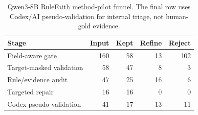 \begin{table}[t]
\centering
\small
\begin{tabular}{lrrrr}
\toprule
Stage & Input & Kept & Refine & Reject \\
\midrule
Field-aware gate & 160 & 58 & 13 & 102 \\
Target-masked validation & 58 & 47 & 8 & 3 \\
Rule/evidence audit & 47 & 25 & 16 & 6 \\
Targeted repair & 16 & 16 & 0 & 0 \\
Codex pseudo-validation & 41 & 17 & 13 & 11 \\
\bottomrule
\end{tabular}
\caption{Qwen3-8B RuleFaith method-pilot funnel. The final row uses Codex/AI pseudo-validation for internal triage, not human-gold evidence.}
\label{tab:rulefaith-qwen3-funnel}
\end{table}
